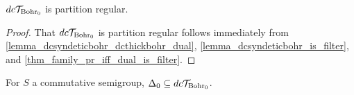 \begin{lemma}
    \label{lemma_dcthickbohr_is_pr}
    \leanok{}
    $dc\mathcal{T}_{\text{Bohr}_0}$ is partition regular.
\end{lemma}

\begin{proof}
    That $dc\mathcal{T}_{\text{Bohr}_0}$ is partition regular follows immediately from \cref{lemma_dcsyndeticbohr_dcthickbohr_dual}, \cref{lemma_dcsyndeticbohr_is_filter}, and \cref{thm_family_pr_iff_dual_is_filter}.
\end{proof}

\begin{theorem}
    \label{thm_delta_zero_set_of_bohr_rec}
    \label{commDeltaZeroImpliesSetOfBohrRecurrence}
    \leanok{}
    For $S$ a commutative semigroup, $\Delta_0 \subseteq dc\mathcal{T}_{\text{Bohr}_0}$.
\end{theorem}

